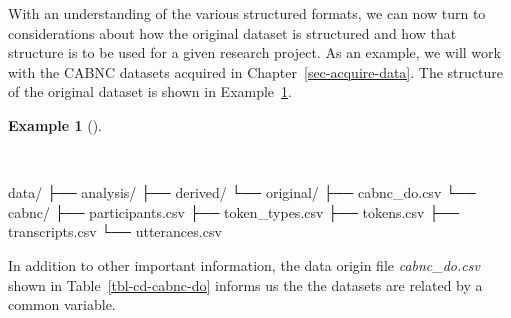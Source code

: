 \documentclass[
  letterpaper,
  DIV=11,
  numbers=noendperiod]{scrreprt}
\newenvironment{Shaded}{\begin{snugshade}}{\end{snugshade}}
\newcommand{\ExtensionTok}[1]{\textcolor[rgb]{0.00,0.00,0.00}{#1}}
\newcommand{\NormalTok}[1]{\textcolor[rgb]{0.00,0.00,0.00}{#1}}
\theoremstyle{definition}
\newtheorem{example}{Example}[chapter]
\theoremstyle{remark}
\begin{document}
With an understanding of the various structured formats, we can now turn
to considerations about how the original dataset is structured and how
that structure is to be used for a given research project. As an
example, we will work with the CABNC datasets acquired in
Chapter~\ref{sec-acquire-data}. The structure of the original dataset is
shown in Example~\ref{exm-cd-cabnc-structure}.

\begin{example}[]\protect\hypertarget{exm-cd-cabnc-structure}{}\label{exm-cd-cabnc-structure}

~

\begin{Shaded}
\begin{Highlighting}[]
\ExtensionTok{data/}
\ExtensionTok{├──}\NormalTok{ analysis/}
\ExtensionTok{├──}\NormalTok{ derived/}
\ExtensionTok{└──}\NormalTok{ original/}
    \ExtensionTok{├──}\NormalTok{ cabnc\_do.csv}
    \ExtensionTok{└──}\NormalTok{ cabnc/}
        \ExtensionTok{├──}\NormalTok{ participants.csv}
        \ExtensionTok{├──}\NormalTok{ token\_types.csv}
        \ExtensionTok{├──}\NormalTok{ tokens.csv}
        \ExtensionTok{├──}\NormalTok{ transcripts.csv}
        \ExtensionTok{└──}\NormalTok{ utterances.csv}
\end{Highlighting}
\end{Shaded}

\end{example}

In addition to other important information, the data origin file
\emph{cabnc\_do.csv} shown in Table~\ref{tbl-cd-cabnc-do} informs us the
the datasets are related by a common variable.
\end{document}
